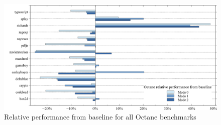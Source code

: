 \begin{figure}[ht]
  \begin{center}
    \centering
    \includegraphics[width=1.0\textwidth]{figures/octane_variation.png}
    \caption{Relative performance from baseline for all Octane benchmarks}
    \label{f:octane_variation}
  \end{center}
\end{figure}
